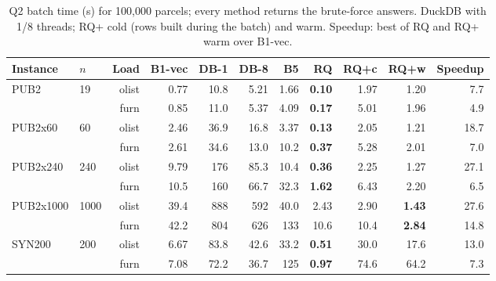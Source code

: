 \begin{table}[t]
\centering\small
\setlength{\tabcolsep}{2.4pt}
\caption{Q2 batch time (s) for 100{,}000 parcels; every method returns the brute-force answers. DuckDB with 1/8 threads; RQ+ cold (rows built during the batch) and warm. Speedup: best of RQ and RQ+ warm over B1-vec.}
\label{tab:q2}
\begin{tabular}{@{}llrrrrrrrrr@{}}
\toprule
Instance & $n$ & Load & B1-vec & DB-1 & DB-8 & B5 & RQ & RQ+c & RQ+w & Speedup\\
\midrule
PUB2 & 19 & olist & 0.77 & 10.8 & 5.21 & 1.66 & \textbf{0.10} & 1.97 & 1.20 & 7.7\\
 &  & furn & 0.85 & 11.0 & 5.37 & 4.09 & \textbf{0.17} & 5.01 & 1.96 & 4.9\\
\midrule
PUB2x60 & 60 & olist & 2.46 & 36.9 & 16.8 & 3.37 & \textbf{0.13} & 2.05 & 1.21 & 18.7\\
 &  & furn & 2.61 & 34.6 & 13.0 & 10.2 & \textbf{0.37} & 5.28 & 2.01 & 7.0\\
\midrule
PUB2x240 & 240 & olist & 9.79 & 176 & 85.3 & 10.4 & \textbf{0.36} & 2.25 & 1.27 & 27.1\\
 &  & furn & 10.5 & 160 & 66.7 & 32.3 & \textbf{1.62} & 6.43 & 2.20 & 6.5\\
\midrule
PUB2x1000 & 1000 & olist & 39.4 & 888 & 592 & 40.0 & 2.43 & 2.90 & \textbf{1.43} & 27.6\\
 &  & furn & 42.2 & 804 & 626 & 133 & 10.6 & 10.4 & \textbf{2.84} & 14.8\\
\midrule
SYN200 & 200 & olist & 6.67 & 83.8 & 42.6 & 33.2 & \textbf{0.51} & 30.0 & 17.6 & 13.0\\
 &  & furn & 7.08 & 72.2 & 36.7 & 125 & \textbf{0.97} & 74.6 & 64.2 & 7.3\\
\bottomrule
\end{tabular}
\end{table}
